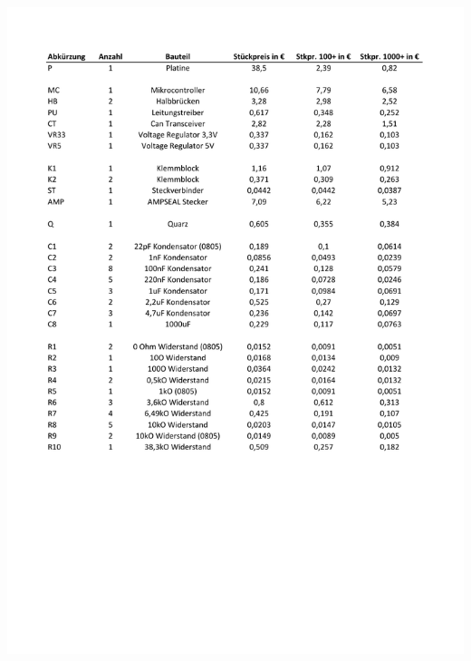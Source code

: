 \begin{center}
	\includegraphics[page=3,width=\columnwidth]{./datenblaetter/Gesamtkosten}
\end{center}